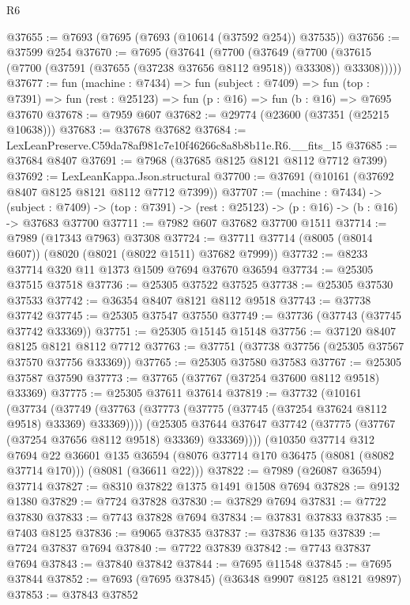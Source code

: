 \begin{lexlean}{R6}
\begin{coremodule}
@37655 := @7693 (@7695 (@7693 (@10614 (@37592 @254)) @37535))
@37656 := @37599 @254
@37670 := @7695
    (@37641
      (@7700
        (@37649
          (@7700 (@37615 (@7700 (@37591 (@37655 (@37238 @37656 @8112 @9518)) @33308)) @33308)))))
@37677 := fun (machine : @7434) =>
  fun (subject : @7409) =>
  fun (top : @7391) => fun (rest : @25123) => fun (p : @16) => fun (b : @16) => @7695 @37670
@37678 := @7959 @607
@37682 := @29774 (@23600 (@37351 (@25215 @10638)))
@37683 := @37678 @37682
@37684 := LexLeanPreserve.C59da78af981c7e10f46266c8a8b8b11e.R6.__fits_15
@37685 := @37684 @8407
@37691 := @7968 (@37685 @8125 @8121 @8112 @7712 @7399)
@37692 := LexLeanKappa.Json.structural
@37700 := @37691 (@10161 (@37692 @8407 @8125 @8121 @8112 @7712 @7399))
@37707 := (machine : @7434) ->
  (subject : @7409) -> (top : @7391) -> (rest : @25123) -> (p : @16) -> (b : @16) -> @37683 @37700
@37711 := @7982 @607 @37682 @37700 @1511
@37714 := @7989 (@17343 @7963) @37308
@37724 := @37711 @37714 (@8005 (@8014 @607)) (@8020 (@8021 (@8022 @1511) @37682 @7999))
@37732 := @8233 @37714 @320 @11 @1373 @1509 @7694 @37670 @36594
@37734 := @25305 @37515 @37518
@37736 := @25305 @37522 @37525
@37738 := @25305 @37530 @37533
@37742 := @36354 @8407 @8121 @8112 @9518
@37743 := @37738 @37742
@37745 := @25305 @37547 @37550
@37749 := @37736 (@37743 (@37745 @37742 @33369))
@37751 := @25305 @15145 @15148
@37756 := @37120 @8407 @8125 @8121 @8112 @7712
@37763 := @37751 (@37738 @37756 (@25305 @37567 @37570 @37756 @33369))
@37765 := @25305 @37580 @37583
@37767 := @25305 @37587 @37590
@37773 := @37765 (@37767 (@37254 @37600 @8112 @9518) @33369)
@37775 := @25305 @37611 @37614
@37819 := @37732
    (@10161
      (@37734
        (@37749 (@37763 (@37773 (@37775 (@37745 (@37254 @37624 @8112 @9518) @33369) @33369))))
        (@25305 @37644 @37647 @37742 (@37775 (@37767 (@37254 @37656 @8112 @9518) @33369) @33369))))
    (@10350
      @37714
      @312
      @7694
      @22
      @36601
      @135
      @36594
      (@8076 @37714 @170 @36475 (@8081 (@8082 @37714 @170)))
      (@8081 (@36611 @22)))
@37822 := @7989 (@26087 @36594) @37714
@37827 := @8310 @37822 @1375 @1491 @1508 @7694
@37828 := @9132 @1380
@37829 := @7724 @37828
@37830 := @37829 @7694
@37831 := @7722 @37830
@37833 := @7743 @37828 @7694
@37834 := @37831 @37833
@37835 := @7403 @8125
@37836 := @9065 @37835
@37837 := @37836 @135
@37839 := @7724 @37837 @7694
@37840 := @7722 @37839
@37842 := @7743 @37837 @7694
@37843 := @37840 @37842
@37844 := @7695 @11548
@37845 := @7695 @37844
@37852 := @7693 (@7695 @37845) (@36348 @9907 @8125 @8121 @9897)
@37853 := @37843 @37852

\end{coremodule}
\end{lexlean}
